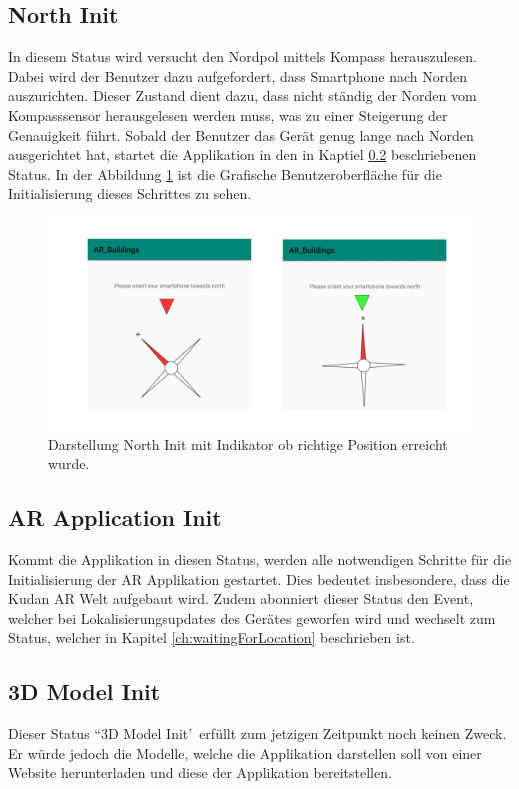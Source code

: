 \documentclass[a4paper]{scrreprt}
\begin{document}
\subsection{North Init} \label{ch:NorthInit}
In diesem Status wird versucht den Nordpol mittels Kompass herauszulesen. Dabei wird der Benutzer dazu aufgefordert, dass Smartphone nach Norden auszurichten. Dieser Zustand dient dazu, dass nicht ständig der Norden vom Kompasssensor herausgelesen werden muss, was zu einer Steigerung der Genauigkeit führt. Sobald der Benutzer das Gerät genug lange nach Norden ausgerichtet hat, startet die Applikation in den in Kaptiel \ref{ch:ARApplicationInit} beschriebenen Status. In der Abbildung \ref{fig:NorthInitProcess} ist die Grafische Benutzeroberfläche für die Initialisierung dieses Schrittes zu sehen.
\begin{figure}[h!]
	\includegraphics[keepaspectratio, width=\textwidth]{NorthInitProcess.png}
	\caption{Darstellung North Init mit Indikator ob richtige Position erreicht wurde.}
    \label{fig:NorthInitProcess}
\end{figure}

\subsection{AR Application Init} \label{ch:ARApplicationInit}
Kommt die Applikation in diesen Status, werden alle notwendigen Schritte für die Initialisierung der AR Applikation gestartet. Dies bedeutet insbesondere, dass die Kudan AR Welt aufgebaut wird. Zudem abonniert dieser Status den Event, welcher bei Lokalisierungsupdates des Gerätes geworfen wird und wechselt zum Status, welcher in Kapitel \ref{ch:waitingForLocation} beschrieben ist.

\subsection{3D Model Init}
Dieser Status \textquotedblleft 3D Model Init\textquoteright\ erfüllt zum jetzigen Zeitpunkt noch keinen Zweck. Er würde jedoch die Modelle, welche die Applikation darstellen soll von einer Website herunterladen und diese der Applikation bereitstellen.
\end{document}
